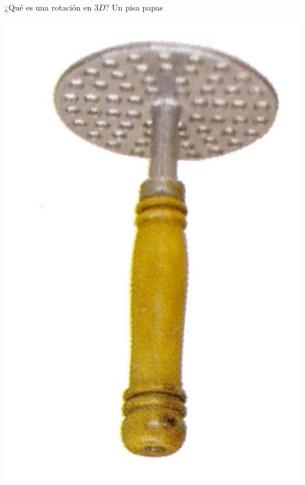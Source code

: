 \documentclass[10pt]{beamer}
\def\R{\mathbb{R}}
\begin{document}
\begin{frame}{¿Qué es una rotación en $3D$? Un pisa papas}




	\includegraphics[scale=0.2]{pisapapas_dadovuelta.png} 

\end{frame}
\end{document}
